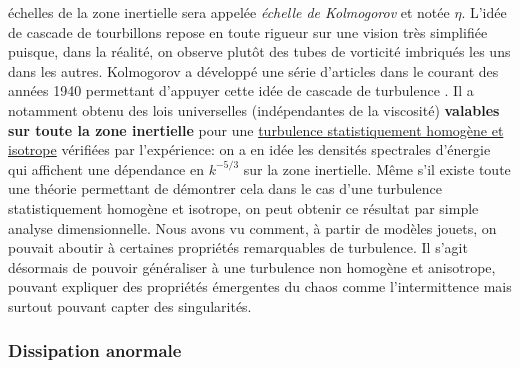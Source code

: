 \documentclass[13pt, a4paper]{extarticle}
\begin{document}
échelles de la zone inertielle sera appelée \emph{échelle de Kolmogorov} et notée $\eta$. L'idée de
cascade de tourbillons repose en toute rigueur sur une vision très simplifiée puisque, dans la 
réalité, on observe plutôt des tubes de vorticité imbriqués les uns dans les autres\cite{Galtier-Turb}.
Kolmogorov a développé une série d'articles dans le courant des années 1940 permettant d'appuyer 
cette idée de cascade de turbulence \cite{K41}.
Il a notamment obtenu des lois universelles (indépendantes de la viscosité) {\bf valables sur 
toute la zone inertielle} pour une \ul{turbulence statistiquement homog\`ene et isotrope} 
vérifiées par l'expérience: on a en idée les densités spectrales d'énergie qui affichent une 
dépendance en $k^{-5/3}$ sur la zone inertielle. Même s'il existe toute une théorie permettant de
démontrer cela dans le cas d'une turbulence statistiquement homogène et isotrope, on peut obtenir
ce résultat par simple analyse dimensionnelle. Nous avons vu comment, à partir de modèles jouets, on
pouvait aboutir à certaines propriétés remarquables de turbulence. Il s'agit désormais de pouvoir
généraliser à une turbulence non homogène et anisotrope, pouvant expliquer des propriétés émergentes du chaos comme 
l'intermittence mais surtout pouvant capter des singularités.

\subsubsection{Dissipation anormale}\label{sec:anomalous}
\end{document}
